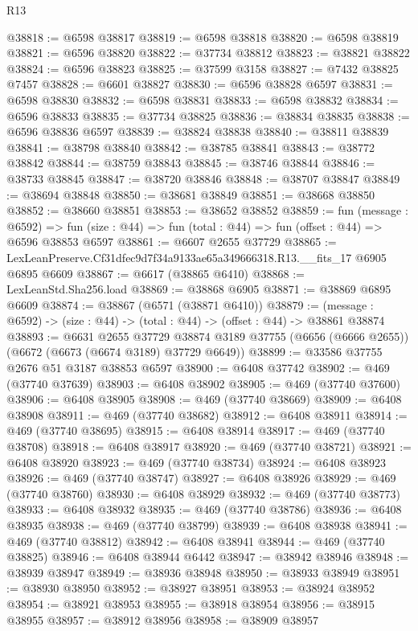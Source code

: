 \begin{lexlean}{R13}
\begin{coremodule}
@38818 := @6598 @38817
@38819 := @6598 @38818
@38820 := @6598 @38819
@38821 := @6596 @38820
@38822 := @37734 @38812
@38823 := @38821 @38822
@38824 := @6596 @38823
@38825 := @37599 @3158
@38827 := @7432 @38825 @7457
@38828 := @6601 @38827
@38830 := @6596 @38828 @6597
@38831 := @6598 @38830
@38832 := @6598 @38831
@38833 := @6598 @38832
@38834 := @6596 @38833
@38835 := @37734 @38825
@38836 := @38834 @38835
@38838 := @6596 @38836 @6597
@38839 := @38824 @38838
@38840 := @38811 @38839
@38841 := @38798 @38840
@38842 := @38785 @38841
@38843 := @38772 @38842
@38844 := @38759 @38843
@38845 := @38746 @38844
@38846 := @38733 @38845
@38847 := @38720 @38846
@38848 := @38707 @38847
@38849 := @38694 @38848
@38850 := @38681 @38849
@38851 := @38668 @38850
@38852 := @38660 @38851
@38853 := @38652 @38852
@38859 := fun (message : @6592) =>
  fun (size : @44) => fun (total : @44) => fun (offset : @44) => @6596 @38853 @6597
@38861 := @6607 @2655 @37729
@38865 := LexLeanPreserve.Cf31dfec9d7f34a9133ae65a349666318.R13.__fits_17 @6905 @6895 @6609
@38867 := @6617 (@38865 @6410)
@38868 := LexLeanStd.Sha256.load
@38869 := @38868 @6905
@38871 := @38869 @6895 @6609
@38874 := @38867 (@6571 (@38871 @6410))
@38879 := (message : @6592) -> (size : @44) -> (total : @44) -> (offset : @44) -> @38861 @38874
@38893 := @6631
    @2655
    @37729
    @38874
    @3189
    @37755
    (@6656 (@6666 @2655))
    (@6672 (@6673 (@6674 @3189) @37729 @6649))
@38899 := @33586 @37755 @2676 @51 @3187 @38853 @6597
@38900 := @6408 @37742
@38902 := @469 (@37740 @37639)
@38903 := @6408 @38902
@38905 := @469 (@37740 @37600)
@38906 := @6408 @38905
@38908 := @469 (@37740 @38669)
@38909 := @6408 @38908
@38911 := @469 (@37740 @38682)
@38912 := @6408 @38911
@38914 := @469 (@37740 @38695)
@38915 := @6408 @38914
@38917 := @469 (@37740 @38708)
@38918 := @6408 @38917
@38920 := @469 (@37740 @38721)
@38921 := @6408 @38920
@38923 := @469 (@37740 @38734)
@38924 := @6408 @38923
@38926 := @469 (@37740 @38747)
@38927 := @6408 @38926
@38929 := @469 (@37740 @38760)
@38930 := @6408 @38929
@38932 := @469 (@37740 @38773)
@38933 := @6408 @38932
@38935 := @469 (@37740 @38786)
@38936 := @6408 @38935
@38938 := @469 (@37740 @38799)
@38939 := @6408 @38938
@38941 := @469 (@37740 @38812)
@38942 := @6408 @38941
@38944 := @469 (@37740 @38825)
@38946 := @6408 @38944 @6442
@38947 := @38942 @38946
@38948 := @38939 @38947
@38949 := @38936 @38948
@38950 := @38933 @38949
@38951 := @38930 @38950
@38952 := @38927 @38951
@38953 := @38924 @38952
@38954 := @38921 @38953
@38955 := @38918 @38954
@38956 := @38915 @38955
@38957 := @38912 @38956
@38958 := @38909 @38957

\end{coremodule}
\end{lexlean}
